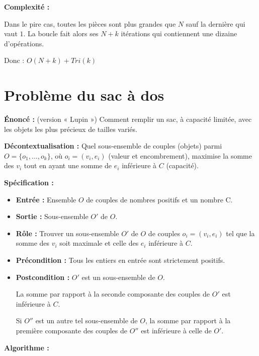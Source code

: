 {\bfseries Complexité :} 

Dans le pire cas, toutes les pièces sont plus grandes que $N$ sauf la dernière qui vaut $1$. La boucle fait alors ses $N+k$ itérations qui contiennent une dizaine d'opérations.

Donc : $O(N+k)+Tri(k)$

\section{Problème du sac à dos}

{\bfseries Énoncé :} (version « Lupin ») Comment remplir un sac, à capacité limitée, avec les
objets les plus précieux de tailles variés.

\medskip

{\bfseries Décontextualisation :} Quel sous-ensemble de couples (objets) parmi $O=\{o_1,
\ldots,o_k\}$, où $o_i=(v_i, e_i)$ (valeur et encombrement), maximise la somme des $v_i$ tout en ayant une somme de $e_i$ inférieure à $C$ (capacité).

\medskip
{\bfseries Spécification :} 

\begin{itemize}
	\item {\bfseries Entrée :} Ensemble $O$ de couples de nombres positifs et un nombre C.
	\item {\bfseries Sortie :} Sous-ensemble $O'$ de $O$.
	\item {\bfseries Rôle :} Trouver un sous-ensemble $O'$ de $O$ de couples $o_i=(v_i, e_i)$ tel que la somme des $v_i$ soit maximale et celle des $e_i$ inférieure à $C$.
	\item {\bfseries Précondition :} Tous les entiers en entrée sont strictement positifs.
	\item {\bfseries Postcondition :} $O'$ est un sous-ensemble de $O$.
	
	La somme par rapport à la seconde composante des couples de $O'$ est inférieure à $C$.
	
	Si $O''$ est un autre tel sous-ensemble de $O$, la somme par rapport à la première composante des couples de $O''$ est inférieure à celle de $O'$.
\end{itemize}

\medskip
{\bfseries Algorithme :} 

